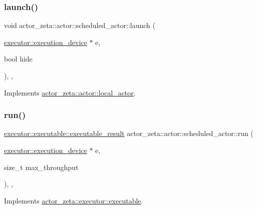 \subsubsection{\texorpdfstring{launch()}{launch()}}
{\footnotesize\ttfamily void actor\+\_\+zeta\+::actor\+::scheduled\+\_\+actor\+::launch (\begin{DoxyParamCaption}\item[{\hyperlink{structactor__zeta_1_1executor_1_1execution__device}{executor\+::execution\+\_\+device} $\ast$}]{e,  }\item[{bool}]{hide }\end{DoxyParamCaption})\hspace{0.3cm}{\ttfamily [final]}, {\ttfamily [override]}, {\ttfamily [virtual]}}



Implements \hyperlink{classactor__zeta_1_1actor_1_1local__actor_acfba412b813aee3250c589bee232f3cd}{actor\+\_\+zeta\+::actor\+::local\+\_\+actor}.

\mbox{\label{classactor__zeta_1_1actor_1_1scheduled__actor_a9031c2f3ff6c8c62698b53fa92e56274}} 
\subsubsection{\texorpdfstring{run()}{run()}}
{\footnotesize\ttfamily \hyperlink{structactor__zeta_1_1executor_1_1executable_aef06c63be7b22b021ade4b83ed4f3cc4}{executor\+::executable\+::executable\+\_\+result} actor\+\_\+zeta\+::actor\+::scheduled\+\_\+actor\+::run (\begin{DoxyParamCaption}\item[{\hyperlink{structactor__zeta_1_1executor_1_1execution__device}{executor\+::execution\+\_\+device} $\ast$}]{e,  }\item[{size\+\_\+t}]{max\+\_\+throughput }\end{DoxyParamCaption})\hspace{0.3cm}{\ttfamily [final]}, {\ttfamily [override]}, {\ttfamily [virtual]}}



Implements \hyperlink{structactor__zeta_1_1executor_1_1executable_a61d6cbce8b124e1e5ef80f8befea2a89}{actor\+\_\+zeta\+::executor\+::executable}.

